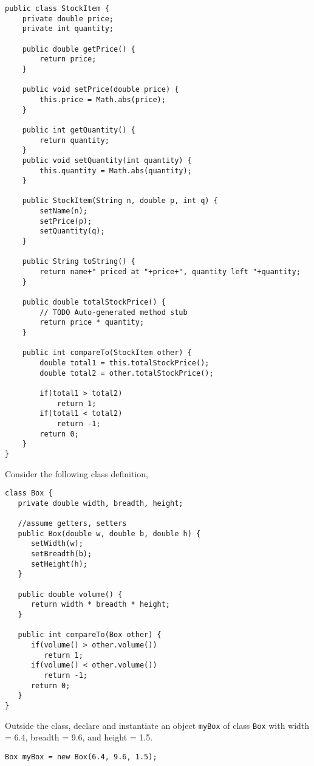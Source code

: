 \documentclass[11pt]{exam}
\begin{document}
\begin{questions}
\begin{solution}
\begin{lstlisting}
public class StockItem {
	private double price;
	private int quantity;
		
	public double getPrice() {
		return price;
	}
	
	public void setPrice(double price) {
		this.price = Math.abs(price);
	}
	
	public int getQuantity() {
		return quantity;
	}
	public void setQuantity(int quantity) {
		this.quantity = Math.abs(quantity);
	}
	
	public StockItem(String n, double p, int q) {
		setName(n);
		setPrice(p);
		setQuantity(q);
	}
	
	public String toString() {
		return name+" priced at "+price+", quantity left "+quantity;
	}

	public double totalStockPrice() {
		// TODO Auto-generated method stub
		return price * quantity;
	}
	
	public int compareTo(StockItem other) {
		double total1 = this.totalStockPrice();
		double total2 = other.totalStockPrice();
		
		if(total1 > total2)
			return 1;
		if(total1 < total2)
			return -1;
		return 0;
	}	
}
\end{lstlisting}	
\end{solution}

\newpage

\question Consider the following class definition,

\begin{lstlisting}
class Box {
   private double width, breadth, height;
   
   //assume getters, setters
   public Box(double w, double b, double h) {
   	  setWidth(w);
   	  setBreadth(b);
   	  setHeight(h);
   }
   
   public double volume() {
   	  return width * breadth * height;
   }
   
   public int compareTo(Box other) {
   	  if(volume() > other.volume())
   	  	 return 1;
   	  if(volume() < other.volume())
   	     return -1;
   	  return 0;
   }
}	
\end{lstlisting}

Outside the class, declare and instantiate an object \texttt{myBox} of class \texttt{Box} with width = 6.4, breadth = 9.6, and height = 1.5.

\begin{solution}
\begin{lstlisting}
Box myBox = new Box(6.4, 9.6, 1.5);	
\end{lstlisting}
\end{solution}


\end{questions}
\end{document}
